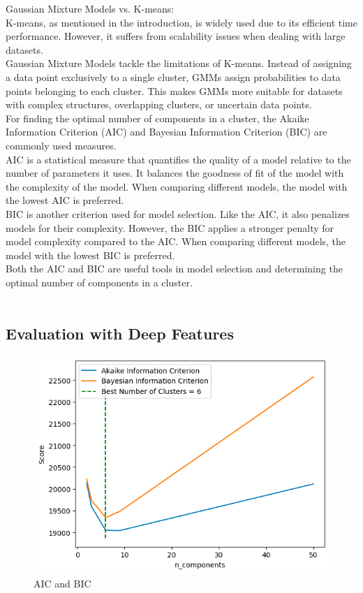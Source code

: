 \documentclass{template}
\begin{document}
Gaussian Mixture Models vs. K-means:\\
K-means, as mentioned in the introduction, is widely used due to its efficient time performance. However, it suffers from scalability issues when dealing with large datasets.\\
Gaussian Mixture Models tackle the limitations of K-means. Instead of assigning a data point exclusively to a single cluster, GMMs assign probabilities to data points belonging to each cluster. This makes GMMs more suitable for datasets with complex structures, overlapping clusters, or uncertain data points.\\

For finding the optimal number of components in a cluster, the Akaike Information Criterion (AIC) and Bayesian Information Criterion (BIC) are commonly used measures.\\
AIC is a statistical measure that quantifies the quality of a model relative to the number of parameters it uses. It balances the goodness of fit of the model with the complexity of the model. When comparing different models, the model with the lowest AIC is preferred.\\
BIC is another criterion used for model selection. Like the AIC, it also penalizes models for their complexity. However, the BIC applies a stronger penalty for model complexity compared to the AIC. When comparing different models, the model with the lowest BIC is preferred.\\
Both the AIC and BIC are useful tools in model selection and determining the optimal number of components in a cluster.\\\\
\subsection{Evaluation with Deep Features}
\begin{figure}
\includegraphics[scale=0.5]{m1.png}
\caption{AIC and BIC }
\label{fig:logo}
\end{figure}
\end{document}
